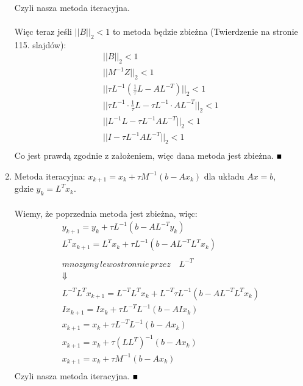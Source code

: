 \documentclass[a4paper]{article}
\renewcommand\qedsymbol{\scalebox{0.75}{$\blacksquare$}} %
\begin{document}
\begin{enumerate}[label=(\alph*)]
\begin{gather*}
            \end{gather*}
            Czyli nasza metoda iteracyjna. \\
            \\
            Więc teraz jeśli $||B||_{2} < 1$ to metoda będzie zbieżna (Twierdzenie na stronie 115. slajdów):
            \begin{gather*}
               ||B||_{2} < 1 \\
               ||M^{-1} Z||_{2} < 1 \\
               ||\tau L^{-1} (\frac{1}{\tau} L - A L^{-T})||_{2} < 1 \\
               ||\tau L^{-1} \cdot \frac{1}{\tau} L - \tau L^{-1} \cdot  A L^{-T}||_{2} < 1 \\
               ||L^{-1} L - \tau L^{-1} A L^{-T}||_{2} < 1 \\
               ||I - \tau L^{-1} A L^{-T}||_{2} < 1 \\
            \end{gather*}
            Co jest prawdą zgodnie z założeniem, więc dana metoda jest zbieżna. $\qedsymbol$

         \item
            Metoda iteracyjna: $x_{k + 1} = x_{k} + \tau M^{-1} (b - A x_{k})$ dla układu $A x = b$, \\
            gdzie $y_{k} = L^{T} x_{k}$. \\
            \\
            Wiemy, że poprzednia metoda jest zbieżna, więc:
            \begin{gather*}
               y_{k+1} = y_{k} + \tau L^{-1} (b - A L^{-T} y_{k}) \\
               L^{T} x_{k+1} = L^{T} x_{k} + \tau L^{-1} (b - A L^{-T} L^{T} x_{k}) \\
               \\
               mnozymy \, lewostronnie\,  przez \quad L^{-T} \\
               \Downarrow \\
               \\
               L^{-T} L^{T} x_{k+1} = L^{-T} L^{T} x_{k} + L^{-T} \tau L^{-1} (b - A L^{-T} L^{T} x_{k}) \\
               I x_{k+1} = I x_{k} + \tau L^{-T} L^{-1} (b - A I x_{k}) \\
               x_{k+1} = x_{k} + \tau L^{-T} L^{-1} (b - A x_{k}) \\
               x_{k+1} = x_{k} + \tau (L L^{T})^{-1} (b - A x_{k}) \\
               x_{k+1} = x_{k} + \tau M^{-1} (b - A x_{k}) \\
            \end{gather*}
            Czyli nasza metoda iteracyjna. $\qedsymbol$
      \end{enumerate}
\end{document}
